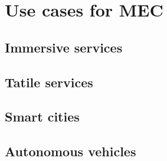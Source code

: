 \section{Use cases for MEC}
\label{use_cases}

\subsection{Immersive services}

\subsection{Tatile services}

\subsection{Smart cities}

\subsection{Autonomous vehicles}
